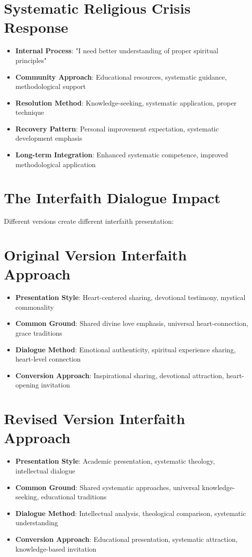\documentclass[11pt,twoside]{book}
\begin{document}
\section*{Systematic Religious Crisis Response}
\label{sec:org8a9460e}
\begin{itemize}
\item \textbf{\textbf{Internal Process}}: "I need better understanding of proper spiritual principles"
\item \textbf{\textbf{Community Approach}}: Educational resources, systematic guidance, methodological support
\item \textbf{\textbf{Resolution Method}}: Knowledge-seeking, systematic application, proper technique
\item \textbf{\textbf{Recovery Pattern}}: Personal improvement expectation, systematic development emphasis
\item \textbf{\textbf{Long-term Integration}}: Enhanced systematic competence, improved methodological application
\end{itemize}
\section*{The Interfaith Dialogue Impact}
\label{sec:orgaa9425c}

Different versions create different interfaith presentation:
\section*{Original Version Interfaith Approach}
\label{sec:orge1cb549}
\begin{itemize}
\item \textbf{\textbf{Presentation Style}}: Heart-centered sharing, devotional testimony, mystical commonality
\item \textbf{\textbf{Common Ground}}: Shared divine love emphasis, universal heart-connection, grace traditions
\item \textbf{\textbf{Dialogue Method}}: Emotional authenticity, spiritual experience sharing, heart-level connection
\item \textbf{\textbf{Conversion Approach}}: Inspirational sharing, devotional attraction, heart-opening invitation
\end{itemize}
\section*{Revised Version Interfaith Approach}
\label{sec:orgc51fb42}
\begin{itemize}
\item \textbf{\textbf{Presentation Style}}: Academic presentation, systematic theology, intellectual dialogue
\item \textbf{\textbf{Common Ground}}: Shared systematic approaches, universal knowledge-seeking, educational traditions
\item \textbf{\textbf{Dialogue Method}}: Intellectual analysis, theological comparison, systematic understanding
\item \textbf{\textbf{Conversion Approach}}: Educational presentation, systematic attraction, knowledge-based invitation
\end{itemize}
\end{document}
